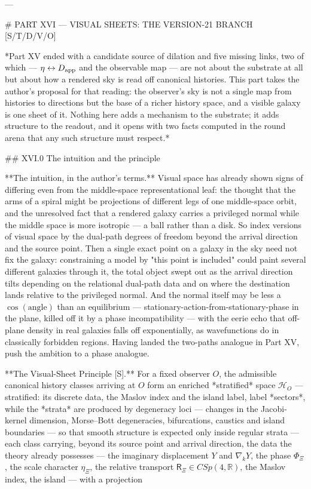 ---

# PART XVI — VISUAL SHEETS: THE VERSION-21 BRANCH [S/T/D/V/O]

*Part XV ended with a candidate source of dilation and five missing links, two of which — $\eta\leftrightarrow D_{\rm app}$ and the observable map — are not about the substrate at all but about how a rendered sky is read off canonical histories. This part takes the author's proposal for that reading: the observer's sky is not a single map from histories to directions but the base of a richer history space, and a visible galaxy is one sheet of it. Nothing here adds a mechanism to the substrate; it adds structure to the readout, and it opens with two facts computed in the round arena that any such structure must respect.*

## XVI.0 The intuition and the principle

**The intuition, in the author's terms.** Visual space has already shown signs of differing even from the middle-space representational leaf: the thought that the arms of a spiral might be projections of different legs of one middle-space orbit, and the unresolved fact that a rendered galaxy carries a privileged normal while the middle space is more isotropic — a ball rather than a disk. So index versions of visual space by the dual-path degrees of freedom beyond the arrival direction and the source point. Then a single exact point on a galaxy in the sky need not fix the galaxy: constraining a model by "this point is included" could paint several different galaxies through it, the total object swept out as the arrival direction tilts depending on the relational dual-path data and on where the destination lands relative to the privileged normal. And the normal itself may be less a $\cos(\text{angle})$ than an equilibrium — stationary-action-from-stationary-phase in the plane, killed off it by a phase incompatibility — with the eerie echo that off-plane density in real galaxies falls off exponentially, as wavefunctions do in classically forbidden regions. Having landed the two-paths analogue in Part XV, push the ambition to a phase analogue.

**The Visual-Sheet Principle [S].** For a fixed observer $O$, the admissible canonical history classes arriving at $O$ form an enriched *stratified* space $\mathscr H_O$ — stratified: its discrete data, the Maslov index and the island label, label *sectors*, while the *strata* are produced by degeneracy loci — changes in the Jacobi-kernel dimension, Morse–Bott degeneracies, bifurcations, caustics and island boundaries — so that smooth structure is expected only inside regular strata — each class carrying, beyond its source point and arrival direction, the data the theory already possesses — the imaginary displacement $Y$ and $\nabla_kY$, the phase $\Phi_\Xi$, the scale character $\eta_\Xi$, the relative transport $\mathsf R_\Xi\in CSp(4,\mathbb R)$, the Maslov index, the island — with a projection

